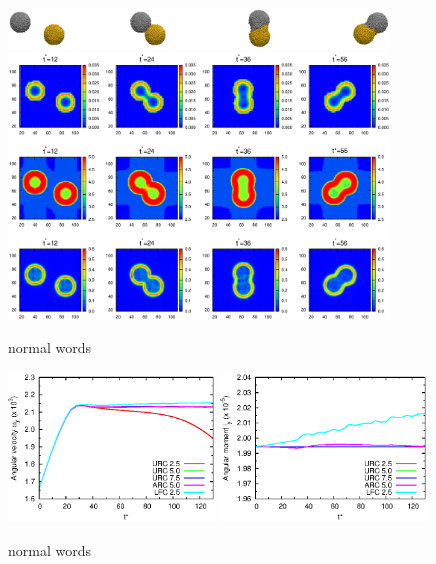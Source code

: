 \documentclass[aps,pre,preprint]{revtex4}
\begin{document}
\begin{figure}
  \centering
  \includegraphics[width=0.90\textwidth]{fig/error-rcut-ball.eps} 
  \includegraphics[width=0.90\textwidth]{fig/error-rcut.eps}
  \caption{normal words}
  \label{fig:tmp8}
\end{figure}

\begin{figure}
  \centering
  \includegraphics[width=0.49\textwidth]{fig/wy.eps}
  \includegraphics[width=0.49\textwidth]{fig/ly.eps}
  \caption{normal words}
  \label{fig:tmp10}
\end{figure}



% 
\end{document}
